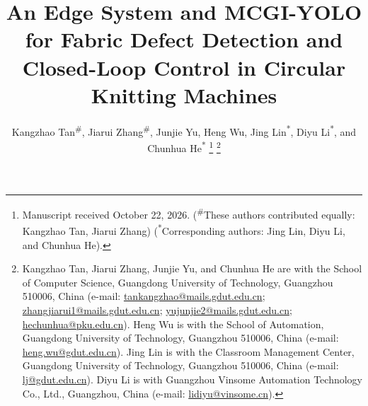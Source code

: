 \documentclass[journal]{IEEEtranTIE}
\begin{document}
\raggedbottom

\title{An Edge System and MCGI-YOLO for Fabric Defect Detection and Closed-Loop Control in Circular Knitting Machines}

\author{Kangzhao Tan\textsuperscript{\#}, Jiarui Zhang\textsuperscript{\#}, Junjie Yu, Heng Wu, Jing Lin\textsuperscript{*}, Diyu Li\textsuperscript{*}, and Chunhua He\textsuperscript{*}%
\thanks{Manuscript received October 22, 2026. (\textsuperscript{\#}These authors contributed equally: Kangzhao Tan, Jiarui Zhang) (\textsuperscript{*}Corresponding authors: Jing Lin, Diyu Li, and Chunhua He).}%
\thanks{\begingroup{}Kangzhao Tan, Jiarui Zhang, Junjie Yu, and Chunhua He are with the School of Computer Science, Guangdong University of Technology, Guangzhou 510006, China (e-mail: \protect\url{tankangzhao@mails.gdut.edu.cn}; \protect\url{zhangjiarui1@mails.gdut.edu.cn}; \protect\url{yujunjie2@mails.gdut.edu.cn}; \protect\url{hechunhua@pku.edu.cn}). Heng Wu is with the School of Automation, Guangdong University of Technology, Guangzhou 510006, China (e-mail: \protect\url{heng.wu@gdut.edu.cn}). Jing Lin is with the Classroom Management Center, Guangdong University of Technology, Guangzhou 510006, China (e-mail: \protect\url{lj@gdut.edu.cn}). Diyu Li is with Guangzhou Vinsome Automation Technology Co., Ltd., Guangzhou, China (e-mail: \protect\url{lidiyu@vinsome.cn}).\endgroup}%
}

\maketitle
\end{document}

